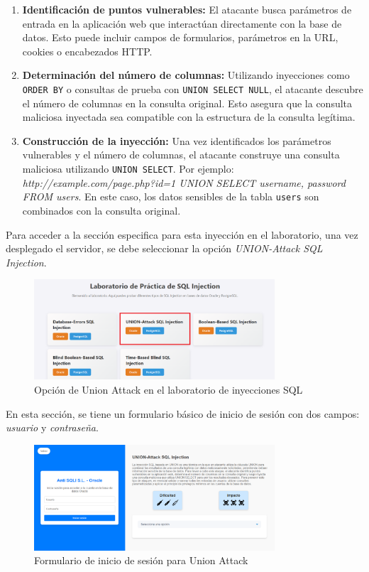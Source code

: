 \documentclass[a4paper,12pt]{article}
\begin{document}
\begin{enumerate}
    \item \textbf{Identificación de puntos vulnerables:} El atacante busca parámetros de entrada en la aplicación web que interactúan directamente con la base de datos. Esto puede incluir campos de formularios, parámetros en la URL, cookies o encabezados HTTP.
    
    \item \textbf{Determinación del número de columnas:} Utilizando inyecciones como \texttt{ORDER BY} o consultas de prueba con \texttt{UNION SELECT NULL}, el atacante descubre el número de columnas en la consulta original. Esto asegura que la consulta maliciosa inyectada sea compatible con la estructura de la consulta legítima.
    
    \item \textbf{Construcción de la inyección:} Una vez identificados los parámetros vulnerables y el número de columnas, el atacante construye una consulta maliciosa utilizando \texttt{UNION SELECT}. Por ejemplo: \textit{http://example.com/page.php?id=1 UNION SELECT username, password FROM users}. En este caso, los datos sensibles de la tabla \texttt{users} son combinados con la consulta original.
\end{enumerate}

Para acceder a la sección especifica para esta inyección en el laboratorio, una vez desplegado el servidor, se debe seleccionar la opción \textit{UNION-Attack SQL Injection}.

\begin{figure}[H]
    \centering
    \includegraphics[width=0.8\textwidth]{Imagenes/union1.png}
    \caption{Opción de Union Attack en el laboratorio de inyecciones SQL}
\end{figure}

En esta sección, se tiene un formulario básico de inicio de sesión con dos campos: \textit{usuario} y \textit{contraseña}.

\begin{figure}[H]
    \centering
    \includegraphics[width=0.8\textwidth]{Imagenes/union2.png}
    \caption{Formulario de inicio de sesión para Union Attack}
\end{figure}
\end{document}
